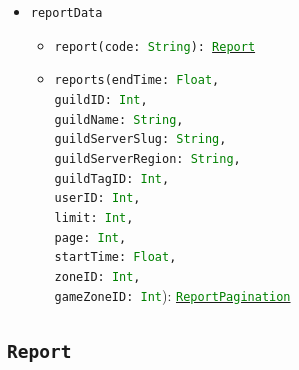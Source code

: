 \documentclass[10pt, a4paper]{memoir}
\numberwithin{equation}{section}
\theoremstyle{plain}
\theoremstyle{defp}
\theoremstyle{dotless}
\theoremstyle{definition}
\theoremstyle{dotless}
\theoremstyle{dotless}
\theoremstyle{defp}
\theoremstyle{defp}
\theoremstyle{be}          %
\theoremstyle{defp}
\newcommand\ttt[1]{\texttt{#1}}
\newcommand\type[1]{\ttt{\textcolor{green}{#1}}}
\begin{document}
\begin{itemize} [noitemsep,topsep=1pt]
\item \ttt{reportData}
	\begin{itemize}[noitemsep,topsep=1pt]
		\item \ttt{report(code: \type{String}): \hyperref[sec:Report]{\type{Report}}}
		\item \ttt{reports(endTime: \type{Float}, \\guildID: \type{Int}, \\guildName: \type{String}, \\guildServerSlug: \type{String}, \\guildServerRegion: \type{String}, \\guildTagID: \type{Int}, \\userID: \type{Int}, \\limit: \type{Int}, \\page: \type{Int}, \\startTime: \type{Float}, \\zoneID: \type{Int}, \\gameZoneID: \type{Int}}): \hyperref[sec:reportpagination]{\type{ReportPagination}}
	\end{itemize}
\end{itemize}

\subsection{\ttt{Report}}\label{sec:Report}
\end{document}
